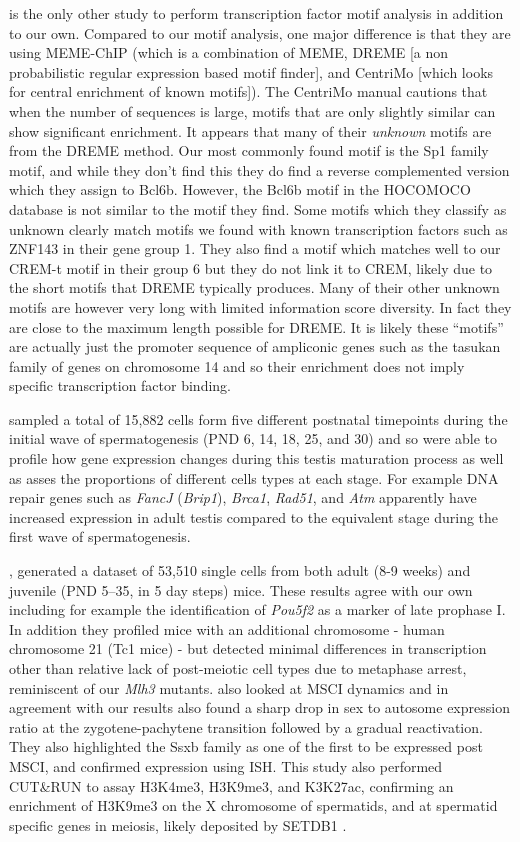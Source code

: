 \cite{Green2018Comprehensive} is the only other study to perform transcription factor motif analysis in addition to our own. Compared to our motif analysis, one major difference is that they are using MEME-ChIP (which is a combination of MEME, DREME [a non probabilistic regular expression based motif finder], and CentriMo [which looks for central enrichment of known motifs]). The CentriMo manual cautions that when the number of sequences is large, motifs that are only slightly similar can show significant enrichment. It appears that many of their \emph{unknown} motifs are from the DREME method.  Our most commonly found motif is the Sp1 family motif, and while they don't find this they do find a reverse complemented version which they assign to Bcl6b. However, the Bcl6b motif in the HOCOMOCO database is not similar to the motif they find. Some motifs which they classify as unknown clearly match motifs we found with known transcription factors such as ZNF143 in their gene group 1. They also find a motif which matches well to our CREM-t motif in their group 6 but they do not link it to CREM, likely due to the short motifs that DREME typically produces. Many of their other unknown motifs are however very long with limited information score diversity. In fact they are close to the maximum length possible for DREME. It is likely these ``motifs'' are actually just the promoter sequence of ampliconic genes such as the tasukan family of genes on chromosome 14 and so their enrichment does not imply specific transcription factor binding.

\cite{Grive2019Dynamic} sampled a total of 15,882 cells form five different postnatal timepoints during the initial wave of spermatogenesis (PND 6, 14, 18, 25, and 30) and so were able to profile how gene expression changes during this testis maturation process as well as asses the proportions of different cells types at each stage. For example DNA repair genes such as \textit{FancJ} (\textit{Brip1}), \textit{Brca1}, \textit{Rad51}, and \textit{Atm} apparently have increased expression in adult testis compared to the equivalent stage during the first wave of spermatogenesis.

\cite{Ernst2019Staged}, generated a dataset of 53,510 single cells from both adult (8-9 weeks) and juvenile (PND 5–35, in 5 day steps) mice. These results agree with our own including for example the identification of \textit{Pou5f2} as a marker of late prophase I. In addition they profiled mice with an additional chromosome - human chromosome 21 (Tc1 mice) - but detected minimal differences in transcription other than relative lack of post-meiotic cell types due to metaphase arrest, reminiscent of our \textit{Mlh3} mutants. \cite{Ernst2019Staged} also looked at MSCI dynamics and in agreement with our results also found a sharp drop in sex to autosome expression ratio at the zygotene-pachytene transition followed by a gradual reactivation. They also highlighted the Ssxb family as one of the first to be expressed post MSCI, and confirmed expression using ISH. This study also performed CUT\&RUN to assay H3K4me3, H3K9me3, and K3K27ac, confirming an enrichment of H3K9me3 on the X chromosome of spermatids, and at spermatid specific genes in meiosis, likely deposited by SETDB1 \parencite{Hirota2018SETDB1}.

